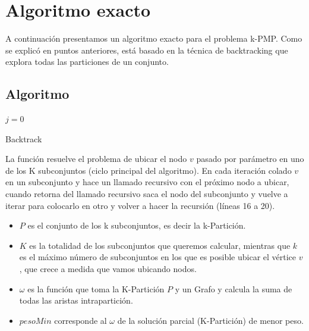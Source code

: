 \section{Algoritmo exacto}

A continuaci\'on presentamos un algoritmo exacto para el problema k-PMP. Como se explic\'o en puntos anteriores, est\'a basado en la t\'ecnica de backtracking que explora todas las particiones de un conjunto.

\subsection{Algoritmo}

\begin{algorithm}[H]


	$j=0$\;

\caption{Backtrack\label{lala}}
\end{algorithm}

La funci\'on resuelve el problema de ubicar el nodo $v$ pasado por par\'ametro en uno de los K subconjuntos (ciclo principal del algoritmo). En cada iteraci\'on colado $v$ en un subconjunto y hace un llamado recursivo con el pr\'oximo nodo a ubicar, cuando retorna del llamado recursivo saca el nodo del subconjunto y vuelve a iterar para colocarlo en otro y volver a hacer la recursi\'on (l\'ineas 16 a 20).

\begin{itemize}
\item $P$ es el conjunto de los k subconjuntos, es decir la k-Partici\'on.

\item $K$ es la totalidad de los subconjuntos que queremos calcular, mientras que $k$ es el m\'aximo n\'umero de subconjuntos en los que es posible ubicar el v\'ertice $v$, que crece a medida que vamos ubicando nodos.

\item $\omega$ es la funci\'on que toma la K-Partici\'on $P$ y un Grafo y calcula la suma de todas las aristas intrapartici\'on.

\item $pesoMin$ corresponde al $\omega$ de la soluci\'on parcial (K-Partici\'on) de menor peso.

\end{itemize}


